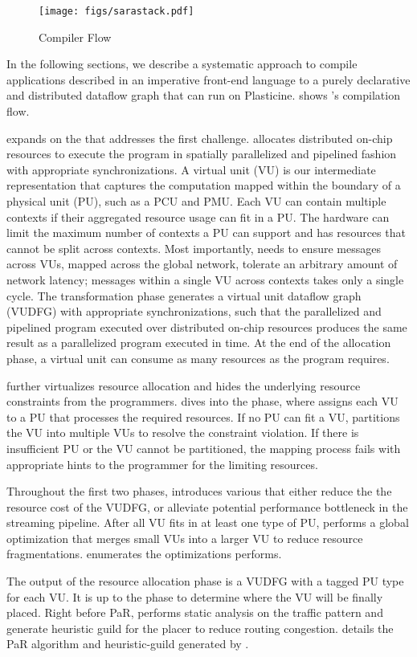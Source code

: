 \begin{figure*}
\centering
\texttt{[image: figs/sarastack.pdf]}
\caption[\name Compiler Flow]{\name Compiler Flow}
\label{fig:flow}
\end{figure*}
 
In the following sections, we describe a systematic approach to compile applications described in an
imperative front-end language to a purely declarative and distributed dataflow graph that can
run on Plasticine.  shows \name's compilation flow.

 expands on the  that
addresses the first challenge.
\name allocates distributed on-chip resources to execute the program in spatially parallelized and
pipelined fashion with appropriate synchronizations.
A virtual unit (VU) is our intermediate representation that captures the computation mapped
within the boundary of a physical unit (PU), such as a PCU and PMU.
Each VU can contain multiple contexts if their aggregated resource usage can fit in a PU.
The hardware can limit the maximum number of contexts a PU can support and has resources that cannot be split across contexts.
Most importantly, \name needs to ensure messages across VUs, mapped across the global network,
tolerate an arbitrary amount of network latency; messages within a single VU across contexts takes only a single cycle.
The transformation phase generates a virtual unit dataflow graph (VUDFG) with appropriate
synchronizations, such that the parallelized and pipelined program executed over distributed on-chip resources produces the same result as a
parallelized program executed in time.
At the end of the allocation phase, a virtual unit can consume as many resources as the program
requires. 

\name further virtualizes resource allocation and hides the underlying resource constraints from the programmers.
 dives into the  phase, where \name assigns each VU to a
PU that processes the required resources. If no PU can fit a VU, \name partitions the
VU into multiple VUs to resolve the constraint violation. If there is insufficient PU or the VU cannot be partitioned, the mapping process fails with appropriate hints to the programmer for the
limiting resources.

Throughout the first two phases, \name introduces various  that either reduce the
the resource cost of the VUDFG, or alleviate potential performance bottleneck in the streaming
pipeline.
After all VU fits in at least one type of PU, \name performs a global optimization that merges small VUs into a larger VU to reduce resource fragmentations.
 enumerates the optimizations \name performs.

The output of the resource allocation phase is a VUDFG with a tagged PU type for each VU.
It is up to the
 phase to determine where the VU will be finally placed.
Right before PaR, \name performs static analysis on the traffic pattern and generate heuristic guild
for the placer to reduce routing congestion.
 details the PaR algorithm and heuristic-guild generated by \name.

